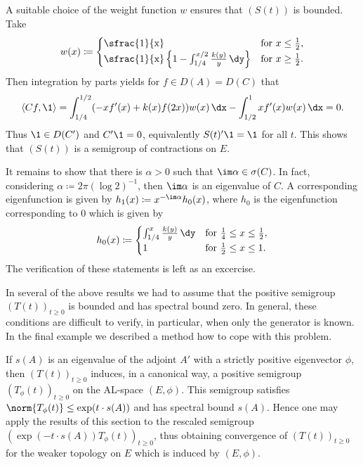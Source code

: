 \begin{example}
A suitable choice of the weight function $w$ ensures that $(S(t))$ is bounded.
Take
\begin{equation}\label{eq:c4-2.14}
w(x) \coloneqq \begin{cases}
    \text{\sfrac{1}{x}} & \text{for } x \leq \frac{1}{2}, \\
    \text{\sfrac{1}{x}} \left\{1 - \int_{1/4}^{x/2} \frac{k(y)}{y} \, \dy \right\} & \text{for } x \geq \frac{1}{2}.
\end{cases}
\end{equation}
Then integration by parts yields for $f \in D(A) = D(C)$ that
\begin{align*}
\langle Cf,\1 \rangle = \int_{1/4}^{1/2} (-xf'(x) + k(x)f(2x))w(x) \, \dx - \int_{1/2}^{1} xf'(x)w(x) \, \dx = 0.
\end{align*}
Thus $\1 \in D(C')$ and $C'\1 = 0$, equivalently $S(t)'\1 = \1$ for all $t$.
This shows that $(S(t))$ is a semigroup of contractions on $E$.

It remains to show that there is $\alpha > 0$ such that $\im\alpha \in \sigma(C)$.
In fact, considering $\alpha \coloneqq 2\pi(\log 2)^{-1}$,  then $\im\alpha$ is an eigenvalue of\/ $C$.
A corresponding eigenfunction is given by $h_{1}(x) \coloneq  x^{-\im\alpha}h_{0}(x)$, where $h_{0}$ is the eigenfunction corresponding to $0$ which is given by
\begin{equation}\label{eq:c4-2.15}
h_{0}(x) \coloneq  \begin{cases}
    \int_{1/4}^{x} \frac{k(y)}{y} \, \dy & \text{for } \frac{1}{4} \leq x \leq \frac{1}{2}, \\
    1 & \text{for } \frac{1}{2} \leq x \leq 1.
\end{cases}
\end{equation}
The verification of these statements is left as an excercise.
\end{example}

In several of the above results we had to assume that the positive semigroup $(T(t))_{t\geq 0}$ is bounded and has spectral bound zero.
In general, these conditions are difficult to verify, in particular, when only the generator is known.
In the final example we described a method how to cope with this problem. 

If\/ $s(A)$ is an eigenvalue of the adjoint $A'$ with a strictly positive eigenvector $\phi$, then $(T(t))_{t\geq 0}$ induces, in a canonical way, a positive semigroup $(T_{\phi}(t))_{t \geq 0}$ on the AL-space $(E,\phi)$.
This semigroup satisfies $\norm{T_{\phi}(t)} \leq \exp(t \cdot s(A))$ and has spectral bound $s(A)$.
Hence one may apply the results of this section to the rescaled semigroup $(\exp(-t \cdot s(A))T_{\phi}(t))_{t \geq 0}$, thus obtaining convergence of\/ $(T(t))_{t \geq 0}$ for the weaker topology on $E$ which is induced by $(E,\phi)$.

